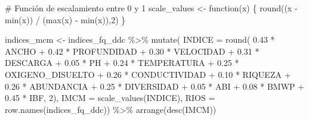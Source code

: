\documentclass[
  10pt,
  letterpaper,
  DIV=11,
  numbers=noendperiod]{scrreprt}
\newenvironment{Shaded}{\begin{snugshade}}{\end{snugshade}}
\newcommand{\AttributeTok}[1]{\textcolor[rgb]{0.40,0.45,0.13}{#1}}
\newcommand{\CommentTok}[1]{\textcolor[rgb]{0.37,0.37,0.37}{#1}}
\newcommand{\ControlFlowTok}[1]{\textcolor[rgb]{0.00,0.23,0.31}{#1}}
\newcommand{\DecValTok}[1]{\textcolor[rgb]{0.68,0.00,0.00}{#1}}
\newcommand{\FloatTok}[1]{\textcolor[rgb]{0.68,0.00,0.00}{#1}}
\newcommand{\FunctionTok}[1]{\textcolor[rgb]{0.28,0.35,0.67}{#1}}
\newcommand{\NormalTok}[1]{\textcolor[rgb]{0.00,0.23,0.31}{#1}}
\newcommand{\OtherTok}[1]{\textcolor[rgb]{0.00,0.23,0.31}{#1}}
\newcommand{\SpecialCharTok}[1]{\textcolor[rgb]{0.37,0.37,0.37}{#1}}
\begin{document}
\begin{Shaded}
\begin{Highlighting}[numbers=left,,]
\CommentTok{\# Función de escalamiento entre 0 y 1}
\NormalTok{scale\_values }\OtherTok{\textless{}{-}} \ControlFlowTok{function}\NormalTok{(x) \{}
  \FunctionTok{round}\NormalTok{((x }\SpecialCharTok{{-}} \FunctionTok{min}\NormalTok{(x)) }\SpecialCharTok{/}\NormalTok{ (}\FunctionTok{max}\NormalTok{(x) }\SpecialCharTok{{-}} \FunctionTok{min}\NormalTok{(x)),}\DecValTok{2}\NormalTok{)}
\NormalTok{\}}

\NormalTok{indices\_mcm }\OtherTok{\textless{}{-}}\NormalTok{ indices\_fq\_ddc }\SpecialCharTok{\%\textgreater{}\%}
  \FunctionTok{mutate}\NormalTok{(}
    \AttributeTok{INDICE =} \FunctionTok{round}\NormalTok{(}
      \FloatTok{0.43} \SpecialCharTok{*}\NormalTok{ ANCHO }\SpecialCharTok{+}
      \FloatTok{0.42} \SpecialCharTok{*}\NormalTok{ PROFUNDIDAD }\SpecialCharTok{+}
      \FloatTok{0.30} \SpecialCharTok{*}\NormalTok{ VELOCIDAD }\SpecialCharTok{+}
      \FloatTok{0.31} \SpecialCharTok{*}\NormalTok{ DESCARGA }\SpecialCharTok{+}
      \FloatTok{0.05} \SpecialCharTok{*}\NormalTok{ PH }\SpecialCharTok{+}
      \FloatTok{0.24} \SpecialCharTok{*}\NormalTok{ TEMPERATURA }\SpecialCharTok{+}
      \FloatTok{0.25} \SpecialCharTok{*}\NormalTok{ OXIGENO\_DISUELTO }\SpecialCharTok{+}
      \FloatTok{0.26} \SpecialCharTok{*}\NormalTok{ CONDUCTIVIDAD }\SpecialCharTok{+}
      \FloatTok{0.10} \SpecialCharTok{*}\NormalTok{ RIQUEZA }\SpecialCharTok{+}
      \FloatTok{0.26} \SpecialCharTok{*}\NormalTok{ ABUNDANCIA }\SpecialCharTok{+}
      \FloatTok{0.25} \SpecialCharTok{*}\NormalTok{ DIVERSIDAD }\SpecialCharTok{+}
      \FloatTok{0.05} \SpecialCharTok{*}\NormalTok{ ABI }\SpecialCharTok{+}
      \FloatTok{0.08} \SpecialCharTok{*}\NormalTok{ BMWP }\SpecialCharTok{+}
      \FloatTok{0.45} \SpecialCharTok{*}\NormalTok{ IBF, }\DecValTok{2}\NormalTok{),}
    \AttributeTok{IMCM =}  \FunctionTok{scale\_values}\NormalTok{(INDICE),}
    \AttributeTok{RIOS =} \FunctionTok{row.names}\NormalTok{(indices\_fq\_ddc)) }\SpecialCharTok{\%\textgreater{}\%} 
  \FunctionTok{arrange}\NormalTok{(}\FunctionTok{desc}\NormalTok{(IMCM))}


\end{Highlighting}
\end{Shaded}
\end{document}
